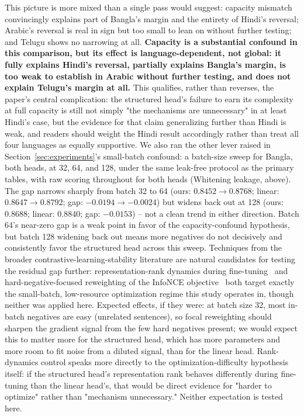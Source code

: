 \documentclass[manuscript]{acmart}
\begin{document}
This picture is more mixed than a single pass would suggest: capacity mismatch convincingly explains part of Bangla's margin and the entirety of Hindi's reversal; Arabic's reversal is real in sign but too small to lean on without further testing; and Telugu shows no narrowing at all. \textbf{Capacity is a substantial confound in this comparison, but its effect is language-dependent, not global: it fully explains Hindi's reversal, partially explains Bangla's margin, is too weak to establish in Arabic without further testing, and does not explain Telugu's margin at all.} This qualifies, rather than reverses, the paper's central complication: the structured head's failure to earn its complexity at full capacity is still not simply "the mechanisms are unnecessary" in at least Hindi's case, but the evidence for that claim generalizing further than Hindi is weak, and readers should weight the Hindi result accordingly rather than treat all four languages as equally supportive. We also ran the other lever raised in Section~\ref{sec:experiments}'s small-batch confound: a batch-size sweep for Bangla, both heads, at 32, 64, and 128, under the same leak-free protocol as the primary tables, with raw scoring throughout for both heads (Whitening leakage, above). The gap narrows sharply from batch 32 to 64 (ours: $0.8452\to0.8768$; linear: $0.8647\to0.8792$; gap: $-0.0194\to-0.0024$) but widens back out at 128 (ours: $0.8688$; linear: $0.8840$; gap: $-0.0153$) -- not a clean trend in either direction. Batch 64's near-zero gap is a weak point in favor of the capacity-confound hypothesis, but batch 128 widening back out means more negatives do not decisively and consistently favor the structured head across this sweep. Techniques from the broader contrastive-learning-stability literature are natural candidates for testing the residual gap further: representation-rank dynamics during fine-tuning~\citep{jung2024rank} and hard-negative-focused reweighting of the InfoNCE objective~\citep{hou2023focalinfonce} both target exactly the small-batch, low-resource optimization regime this study operates in, though neither was applied here. Expected effects, if they were: at batch size 32, most in-batch negatives are easy (unrelated sentences), so focal reweighting should sharpen the gradient signal from the few hard negatives present; we would expect this to matter more for the structured head, which has more parameters and more room to fit noise from a diluted signal, than for the linear head. Rank-dynamics control speaks more directly to the optimization-difficulty hypothesis itself: if the structured head's representation rank behaves differently during fine-tuning than the linear head's, that would be direct evidence for "harder to optimize" rather than "mechanism unnecessary." Neither expectation is tested here.
\end{document}
